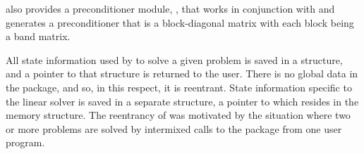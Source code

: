 {\idas} also provides a preconditioner module,
{\idabbdpre}, that works in conjunction with {\nvecp} and generates a 
preconditioner that is a block-diagonal matrix with each block being 
a band matrix.

All state information used by {\idas} to solve a given problem is saved
in a structure, and a pointer to that structure is returned to the
user.  There is no global data in the {\idas} package, and so, in this
respect, it is reentrant. State information specific to the linear
solver is saved in a separate structure, a pointer to which resides in
the {\idas} memory structure. The reentrancy of {\idas} was motivated
by the situation where two or more problems are solved by
intermixed calls to the package from one user program.

